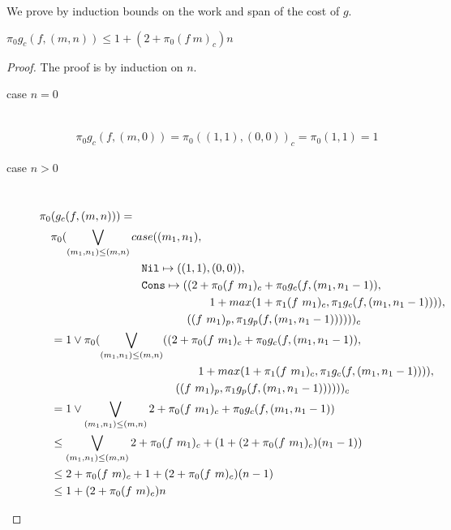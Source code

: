 %
We prove by induction bounds on the work and span of the cost of $g$.
%
\begin{theorem}
$\pi_0 g_c(f, (m, n)) \leq 1 + (2 + \pi_0(f\ m)_c)n$
\end{theorem}
%
\begin{proof}
   The proof is by induction on $n$.
  \begin{description}
    \item[case $n=0$]\mbox{}\\[-1.5\baselineskip]
      \begin{align*}
      \pi_0 g_c(f, (m, 0)) = \pi_0((1, 1), (0, 0))_c = \pi_0(1, 1) = 1
      \end{align*}
    \item[case $n>0$]\mbox{}\\[-1.5\baselineskip]
      \[\begin{split}
        &\pi_0(g_c(f, (m, n))) = \\
        &\quad \pi_0(\bigvee\limits_{(m_1, n_1) \leq (m, n)} case((m_1, n_1), \\
        &\quadfive\quadfour \T{Nil} \mapsto ((1, 1), (0, 0)), \\
        &\quadfive\quadfour \T{Cons} \mapsto ((2 + \pi_0(f\ m_1)_c + \pi_0g_c(f, (m_1, n_1-1)), \\
        &\quadfive\quadten                     1 + max(1 + \pi_1(f\ m_1)_c, \pi_1g_c(f, (m_1, n_1-1)))), \\
        &\quadfive\quadeight                  ((f\ m_1)_p, \pi_1 g_p(f, (m_1, n_1-1))))) )_c \\
        &\quad = 1 \vee \pi_0(\bigvee\limits_{(m_1, n_1) \leq (m, n)} ((2 + \pi_0(f\ m_1)_c + \pi_0g_c(f, (m_1, n_1-1)), \\
        &\quadfour\quadten                     1 + max(1 + \pi_1(f\ m_1)_c, \pi_1g_c(f, (m_1, n_1-1)))), \\
        &\quadfour\quadeight                  ((f\ m_1)_p, \pi_1 g_p(f, (m_1, n_1-1))))) )_c \\
        &\quad = 1 \vee \bigvee\limits_{(m_1, n_1) \leq (m, n)} 2 + \pi_0 (f\ m_1)_c + \pi_0 g_c(f, (m_1, n_1-1)) \\
        &\quad \leq \bigvee\limits_{(m_1, n_1) \leq (m, n)} 2 + \pi_0 (f\ m_1)_c + (1 + (2 + \pi_0 (f\ m_1)_c)(n_1-1)) \\
        &\quad \leq 2 + \pi_0 (f\ m)_c + 1 + (2 + \pi_0 (f\ m)_c)(n - 1) \\
        &\quad \leq 1 + (2 + \pi_0 (f\ m)_c)n \\
      \end{split}\]
  \end{description}
\end{proof}
